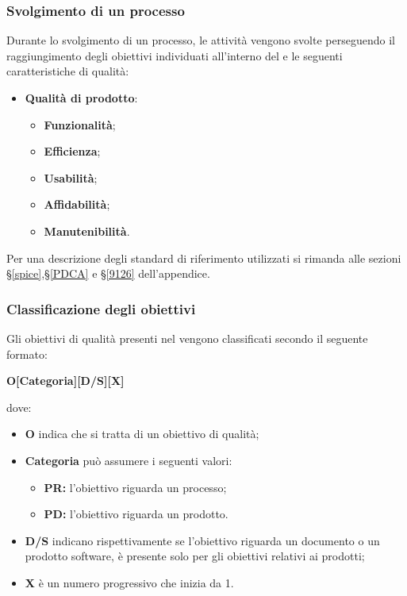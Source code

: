 \subsubsection{Svolgimento di un processo}
Durante lo svolgimento di un processo, le attività vengono svolte perseguendo il raggiungimento degli obiettivi individuati all'interno del  e le seguenti caratteristiche di qualità:
\begin{itemize}
	\item \textbf{Qualità di prodotto}: 
	\begin{itemize}
		\item \textbf{Funzionalità};
		\item \textbf{Efficienza};
		\item \textbf{Usabilità};
		\item \textbf{Affidabilità};
		\item \textbf{Manutenibilità}.
	\end{itemize}
\end{itemize}
Per una descrizione degli standard di riferimento utilizzati si rimanda alle sezioni \S\ref{spice},\S\ref{PDCA} e \S\ref{9126} dell'appendice.

\subsubsection{Classificazione degli obiettivi}
Gli obiettivi di qualità presenti nel  vengono classificati secondo il seguente formato:
\begin{center}
	\textbf{O[Categoria][D/S][X]}
\end{center}
dove: 
\begin{itemize}
	\item \textbf{O} indica che si tratta di un obiettivo di qualità; \\
	\item \textbf{Categoria} può assumere i seguenti valori:
	\begin{itemize}
		\item \textbf{PR:} l'obiettivo riguarda un processo;
		\item \textbf{PD:} l'obiettivo riguarda un prodotto.
	\end{itemize}
	\item \textbf{D/S} indicano rispettivamente se l'obiettivo riguarda un documento o un prodotto software, è presente solo per gli obiettivi relativi ai prodotti;
	\item \textbf{X} è un numero progressivo che inizia da 1.
\end{itemize}

